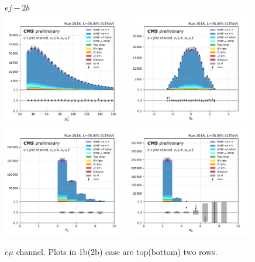 \begin{figure}[ht]
    \centering
    $e j - 2b$ \\
    \includegraphics[width=0.49\textwidth]{chapters/Appendix/sectionPlots/figures/kinematics_pickles/e4j/2b/e4j_2b_lepton1_pt.pdf}
    \includegraphics[width=0.49\textwidth]{chapters/Appendix/sectionPlots/figures/kinematics_pickles/e4j/2b/e4j_2b_lepton1_eta.pdf}
    \includegraphics[width=0.49\textwidth]{chapters/Appendix/sectionPlots/figures/kinematics_pickles/e4j/2b/e4j_2b_nJets.pdf}
    \includegraphics[width=0.49\textwidth]{chapters/Appendix/sectionPlots/figures/kinematics_pickles/e4j/2b/e4j_2b_nBJets.pdf}
    
    \caption{$e\mu$ channel. Plots in 1b(2b) case are top(bottom) two rows.}
\end{figure}
